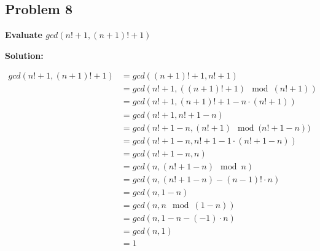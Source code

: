 \subsection{Problem 8}
\textbf{Evaluate $gcd(n! + 1, (n + 1)! + 1)$ }
\par

\begin{flushleft}
    \textbf{Solution: }
    \par
    $$
        \begin{aligned}
            gcd(n!+1, (n + 1)! + 1) & = gcd((n+1)! + 1, n! + 1) \\
            & = gcd( n! + 1, ((n+1)! + 1) \mod{(n! + 1)}) \\
            & = gcd( n! + 1, (n+1)! + 1 - n \cdot (n!+1) ) \\
            & = gcd( n! + 1, n! + 1 - n ) \\
            & = gcd( n! + 1 - n, (n!+1) \mod{(n! + 1 - n}) ) \\
            & = gcd( n! + 1 - n, n! + 1 - 1 \cdot (n! + 1 - n) ) \\
            & = gcd( n! + 1 - n, n ) \\
            & = gcd (n, (n! + 1 - n) \mod{n} ) \\
            & = gcd (n, (n! + 1 -n) - (n-1)! \cdot n ) \\
            & = gcd (n, 1 -n ) \\
            & = gcd (n, n \mod{(1-n)} ) \\   
            & = gcd (n, 1 -n - (-1) \cdot n ) \\
            & = gcd (n, 1) \\
            & = 1 \\
        \end{aligned}
    $$
\end{flushleft}